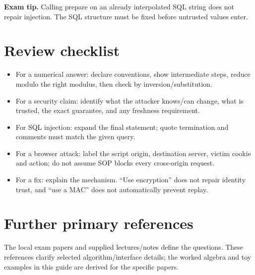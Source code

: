 \documentclass[11pt,a4paper]{article}
\begin{document}
{\color{ForestGreen}\textbf{Exam tip.} Calling prepare on an already interpolated SQL string does not repair injection. The SQL structure must be fixed before untrusted values enter.}



\clearpage
\section{Review checklist}


\begin{itemize}

\item For a numerical answer: declare conventions,\allowbreak{} show intermediate steps,\allowbreak{} reduce modulo the right modulus,\allowbreak{} then check by inversion/\allowbreak{}substitution.

\item For a security claim: identify what the attacker knows/\allowbreak{}can change,\allowbreak{} what is trusted,\allowbreak{} the exact guarantee,\allowbreak{} and any freshness requirement.

\item For SQL injection: expand the final statement; quote termination and comments must match the given query.

\item For a browser attack: label the script origin,\allowbreak{} destination server,\allowbreak{} victim cookie and action; do not assume SOP blocks every cross-origin request.

\item For a fix: explain the mechanism. “Use encryption” does not repair identity trust,\allowbreak{} and “use a MAC” does not automatically prevent replay.

\end{itemize}


\clearpage
\section{Further primary references}

The local exam papers and supplied lectures/\allowbreak{}notes define the questions. These references clarify selected algorithm/\allowbreak{}interface details; the worked algebra and toy examples in this guide are derived for the specific papers.
\end{document}
